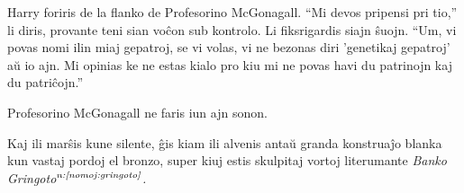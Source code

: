 Harry foriris de la flanko de Profesorino McGonagall. ``Mi devos
pripensi pri tio,'' li diris, provante teni sian voĉon sub
kontrolo. Li fiksrigardis siajn ŝuojn. ``Um, vi povas nomi ilin miaj
gepatroj, se vi volas, vi ne bezonas diri 'genetikaj gepatroj' aŭ io
ajn. Mi opinias ke ne estas kialo pro kiu mi ne povas havi du
patrinojn kaj du patriĉojn.''

Profesorino McGonagall ne faris iun ajn sonon.

Kaj ili marŝis kune silente, ĝis kiam ili alvenis antaŭ granda
konstruaĵo blanka kun vastaj pordoj el bronzo, super kiuj estis
skulpitaj vortoj literumante \emph{Banko
  Gringoto$^{\textit{n:\ref{nomoj:gringoto}}}$.}
